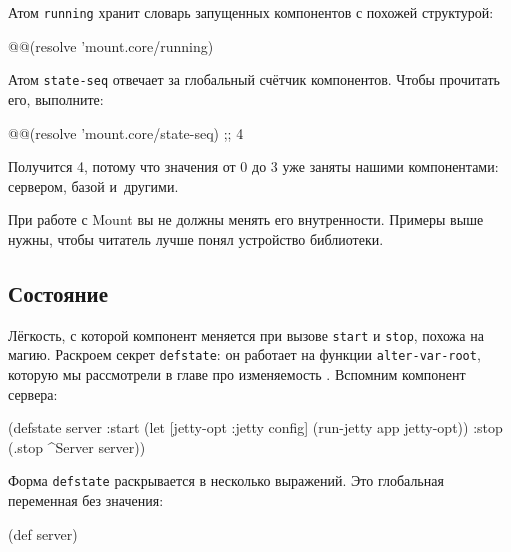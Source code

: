 Атом \verb|running| хранит словарь запущенных компонентов с похожей структурой:

\begin{english}
  \begin{clojure}
@@(resolve 'mount.core/running)
  \end{clojure}
\end{english}

Атом \verb|state-seq| отвечает за глобальный счётчик компонентов. Чтобы
прочитать его, выполните:

\begin{english}
  \begin{clojure}
@@(resolve 'mount.core/state-seq) ;; 4
  \end{clojure}
\end{english}

\noindent
Получится 4, потому что значения от 0 до 3 уже заняты нашими компонентами:
сервером, базой и~другими.

При работе с Mount вы не должны менять его внутренности. Примеры выше нужны,
чтобы читатель лучше понял устройство библиотеки.

\subsection{Состояние}


Лёгкость, с которой компонент меняется при вызове \verb|start| и
\verb|stop|, похожа на магию. Раскроем секрет \verb|defstate|: он работает на
функции \verb|alter-var-root|, которую мы рассмотрели в главе про
изменяемость . Вспомним компонент сервера:

\begin{english}
  \begin{clojure}
(defstate server
  :start
  (let [{jetty-opt :jetty} config]
    (run-jetty app jetty-opt))
  :stop
  (.stop ^Server server))
  \end{clojure}
\end{english}

Форма \verb|defstate| раскрывается в несколько выражений. Это глобальная
переменная без значения:


\begin{english}
  \begin{clojure}
(def server)
  \end{clojure}
\end{english}

